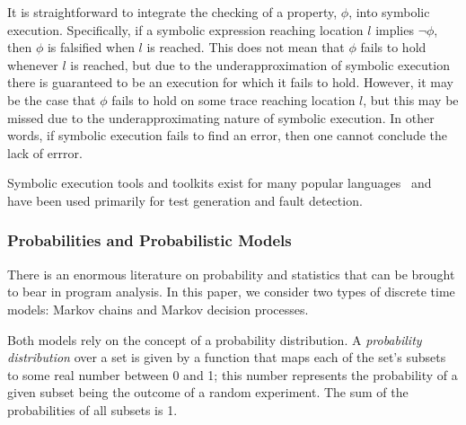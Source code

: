 It is straightforward to integrate the checking of a property,
$\phi$, into symbolic execution.  Specifically,
if a symbolic expression reaching location $l$ implies
 $\neg\phi$, then $\phi$ is falsified 
when $l$ is reached.    This does not mean that $\phi$
fails to hold whenever $l$ is reached, but due to the underapproximation
of symbolic execution there is guaranteed to be an execution for which
it fails to hold.
However, it may be the case that $\phi$ fails to hold
on some trace reaching location $l$, but this may be missed
due to the underapproximating nature of symbolic execution.
In other words, if symbolic execution fails to find an error,
then one cannot conclude the lack of errror.

Symbolic execution tools and toolkits exist for many popular 
languages~\cite{pasareanu2010symbolic,godefroid2005dart,jamrozik2013generating,cadar2008klee}
and have been used primarily for test generation and fault detection.

\subsubsection{Probabilities and Probabilistic Models}

There is an enormous literature on probability and statistics
that can be brought to bear in program analysis.  
In this paper, we consider two types of discrete time models:
Markov chains and Markov decision processes.

Both models rely on the concept of a probability distribution.
A \textit{probability distribution} over a set is given by a function
that maps each of the set's subsets to some real number between 0 and 1;
this number represents the probability of a given subset being the outcome
of a random experiment.
The sum of the probabilities of all subsets is 1.


